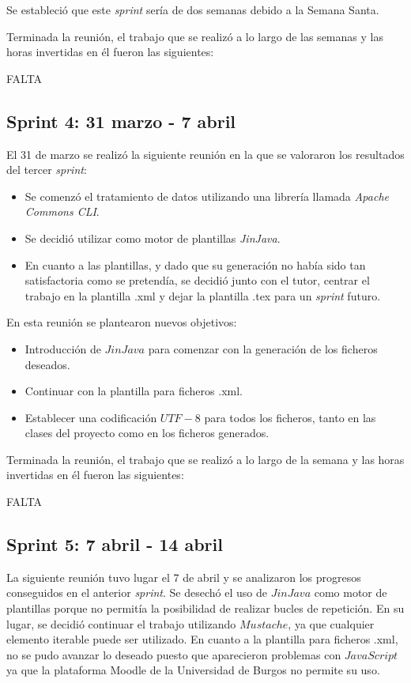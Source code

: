 Se estableció que este \textit{sprint} sería de dos semanas debido a la Semana Santa.

Terminada la reunión, el trabajo que se realizó a lo largo de las semanas y las horas invertidas en él fueron las siguientes:

FALTA 

\subsection{Sprint 4: 31 marzo - 7 abril}

El 31 de marzo se realizó la siguiente reunión en la que se valoraron los resultados del tercer \textit{sprint}:
\begin{itemize}
\item Se comenzó el tratamiento de datos utilizando una librería llamada \textit{Apache Commons CLI}.
\item Se decidió utilizar como motor de plantillas \textit{JinJava}. 
\item En cuanto a las plantillas, y dado que su generación no había sido tan satisfactoria como se pretendía, se decidió junto con el tutor, centrar el trabajo en la plantilla .xml y dejar la plantilla .tex para un \textit{sprint} futuro.
\end{itemize}

En esta reunión se plantearon nuevos objetivos:
\begin{itemize}
\item Introducción de $JinJava$ para comenzar con la generación de los ficheros deseados.
\item Continuar con la plantilla para ficheros .xml.
\item Establecer una codificación $UTF-8$ para todos los ficheros, tanto en las clases del proyecto como en los ficheros generados.
\end{itemize}

Terminada la reunión, el trabajo que se realizó a lo largo de la semana y las horas invertidas en él fueron las siguientes:

FALTA 

\subsection{Sprint 5: 7 abril - 14 abril}
La siguiente reunión tuvo lugar el 7 de abril y se analizaron los progresos conseguidos en el anterior \textit{sprint}. Se desechó el uso de $JinJava$ como motor de plantillas porque no permitía la posibilidad de realizar bucles de repetición. En su lugar, se decidió continuar el trabajo utilizando $Mustache$, ya que cualquier elemento iterable puede ser utilizado. En cuanto a la plantilla para ficheros .xml, no se pudo avanzar lo deseado puesto que aparecieron problemas con $JavaScript$ ya que la plataforma Moodle de la Universidad de Burgos no permite su uso.

